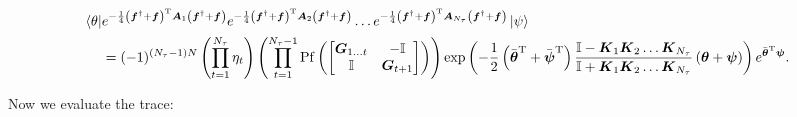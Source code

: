\documentclass{article}
\begin{document}
\begin{align}
	\bra{\theta} &e^{-\frac{1}{4}\left(\boldsymbol{f}^{\dagger} + \boldsymbol{f} \right)^{\mathrm{T}} \boldsymbol{A}_{1}  \left(\boldsymbol{f}^{\dagger} + \boldsymbol{f} \right) }e^{-\frac{1}{4}\left(\boldsymbol{f}^{\dagger} + \boldsymbol{f} \right)^{\mathrm{T}} \boldsymbol{A}_{2}  \left(\boldsymbol{f}^{\dagger} + \boldsymbol{f} \right) }\dots e^{-\frac{1}{4}\left(\boldsymbol{f}^{\dagger} + \boldsymbol{f} \right)^{\mathrm{T}} \boldsymbol{A}_{N_{\tau} }  \left(\boldsymbol{f}^{\dagger} + \boldsymbol{f} \right) } \ket{\psi} 
	\nonumber \\ &
	= (-1)^{\left(N_{\tau}-1\right)N}\left(\prod_{t=1}^{N_\tau} \eta_t\right)\left(\prod_{t=1}^{N_\tau - 1} \mathrm{Pf} \left(\begin{bmatrix}
		\boldsymbol{G}_{1\dots t} & - \mathbb{I} \\
		\mathbb{I} & \boldsymbol{G}_{t + 1} 
	\end{bmatrix} \right) \right) \exp \left( -\frac{1}{2}\left(\bar{\boldsymbol{\theta} }^{\mathrm{T}  } + \bar{\boldsymbol{\psi}}^{\mathrm{T}}\right) \frac{\mathbb{I} - \boldsymbol{K}_{1}\boldsymbol{K}_2\dots \boldsymbol{K}_{N_\tau} }{\mathbb{I} + \boldsymbol{K}_{1}\boldsymbol{K}_2\dots \boldsymbol{K}_{N_\tau}  }\left(\boldsymbol{\theta} + \boldsymbol{\psi}\right) \right)  e^{\bar{\boldsymbol{\theta} }^{\mathrm{T}  }\boldsymbol{\psi} }.
\end{align}

Now we evaluate the trace:
\end{document}
